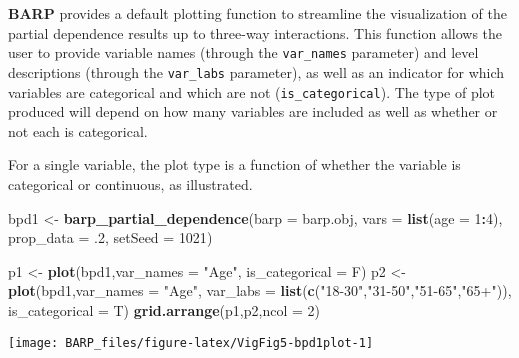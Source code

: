\documentclass[]{article}
\newenvironment{Shaded}{\begin{snugshade}}{\end{snugshade}}
\newcommand{\KeywordTok}[1]{\textcolor[rgb]{0.13,0.29,0.53}{\textbf{#1}}}
\newcommand{\DataTypeTok}[1]{\textcolor[rgb]{0.13,0.29,0.53}{#1}}
\newcommand{\DecValTok}[1]{\textcolor[rgb]{0.00,0.00,0.81}{#1}}
\newcommand{\StringTok}[1]{\textcolor[rgb]{0.31,0.60,0.02}{#1}}
\newcommand{\OperatorTok}[1]{\textcolor[rgb]{0.81,0.36,0.00}{\textbf{#1}}}
\newcommand{\NormalTok}[1]{#1}
\begin{document}
\textbf{BARP} provides a default plotting function to streamline the
visualization of the partial dependence results up to three-way
interactions. This function allows the user to provide variable names
(through the \texttt{var\_names} parameter) and level descriptions
(through the \texttt{var\_labs} parameter), as well as an indicator for
which variables are categorical and which are not
(\texttt{is\_categorical}). The type of plot produced will depend on how
many variables are included as well as whether or not each is
categorical.

For a single variable, the plot type is a function of whether the
variable is categorical or continuous, as illustrated.

\begin{Shaded}
\begin{Highlighting}[]
\NormalTok{bpd1 <-}\StringTok{ }\KeywordTok{barp_partial_dependence}\NormalTok{(}\DataTypeTok{barp =}\NormalTok{ barp.obj,}
                               \DataTypeTok{vars =} \KeywordTok{list}\NormalTok{(}\DataTypeTok{age =} \DecValTok{1}\OperatorTok{:}\DecValTok{4}\NormalTok{),}
                               \DataTypeTok{prop_data =}\NormalTok{ .}\DecValTok{2}\NormalTok{,}
                               \DataTypeTok{setSeed =} \DecValTok{1021}\NormalTok{)}
\end{Highlighting}
\end{Shaded}

\begin{Shaded}
\begin{Highlighting}[]
\NormalTok{p1 <-}\StringTok{ }\KeywordTok{plot}\NormalTok{(bpd1,}\DataTypeTok{var_names =} \StringTok{"Age"}\NormalTok{,}
           \DataTypeTok{is_categorical =}\NormalTok{ F)}
\NormalTok{p2 <-}\StringTok{ }\KeywordTok{plot}\NormalTok{(bpd1,}\DataTypeTok{var_names =} \StringTok{"Age"}\NormalTok{,}
           \DataTypeTok{var_labs =} \KeywordTok{list}\NormalTok{(}\KeywordTok{c}\NormalTok{(}\StringTok{"18-30"}\NormalTok{,}\StringTok{"31-50"}\NormalTok{,}\StringTok{"51-65"}\NormalTok{,}\StringTok{"65+"}\NormalTok{)),}
           \DataTypeTok{is_categorical =}\NormalTok{ T)}
\KeywordTok{grid.arrange}\NormalTok{(p1,p2,}\DataTypeTok{ncol =} \DecValTok{2}\NormalTok{)}
\end{Highlighting}
\end{Shaded}

\begin{center}\texttt{[image: BARP\_files/figure-latex/VigFig5-bpd1plot-1]} \end{center}
\end{document}
